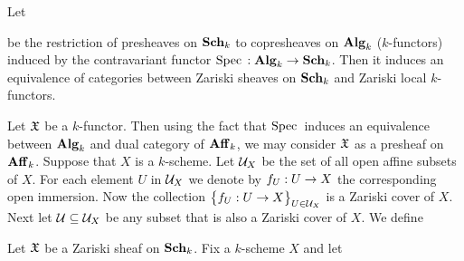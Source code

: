 \begin{theorem}
Let
\begin{center}
\end{center}
be the restriction of presheaves on $\mathbf{Sch}_k$ to copresheaves on $\mathbf{Alg}_k$ ($k$-functors) induced by the contravariant functor $\mathrm{Spec}\,:\mathbf{Alg}_k\rightarrow \mathbf{Sch}_k$. Then it induces an equivalence of categories between Zariski sheaves on $\mathbf{Sch}_k$ and Zariski local $k$-functors.
\end{theorem}
\noindent
Let ${\mathfrak X}$ be a $k$-functor. Then using the fact that $\mathrm{Spec}\,$ induces an equivalence between $\mathbf{Alg}_k$ and dual category of $\mathbf{Aff}_k$, we may consider ${\mathfrak X}$ as a presheaf on $\mathbf{Aff}_k$. Suppose that $X$ is a $k$-scheme. Let ${\mathcal U}_X$ be the set of all open affine subsets of $X$. For each element $U$ in ${\mathcal U}_X$ we denote by $f_U:U\rightarrow X$ the corresponding open immersion. Now the collection $\big\{f_U:U\rightarrow X\big\}_{U \in {\mathcal U}_X}$ is a Zariski cover of $X$. Next let ${\mathcal U}\subseteq {\mathcal U}_X$ be any subset that is also a Zariski cover of $X$. We define

\begin{lemma}
Let ${\mathfrak X}$ be a Zariski sheaf on $\mathbf{Sch}_k$. Fix a $k$-scheme $X$ and let 
\end{lemma}






















































\small




